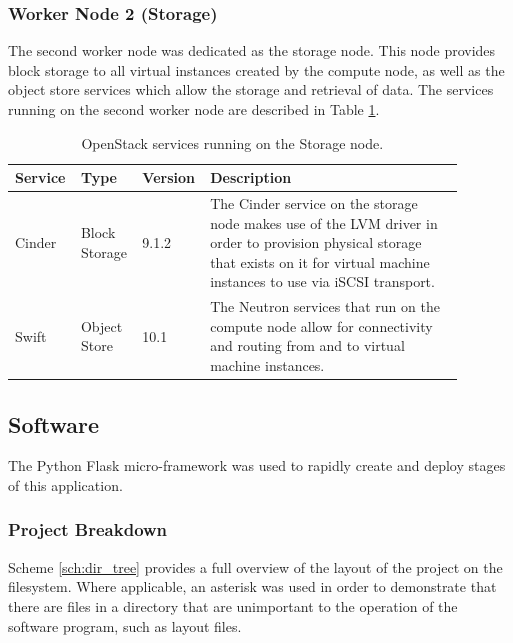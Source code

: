 \subsubsection{Worker Node 2 (Storage)}

The second worker node was dedicated as the storage node. This node provides block storage to all virtual instances created by the compute node, as well as the object store services which allow the storage and retrieval of data. The services running on the second worker node are described in Table \ref{tab:openstack_worker2_services}.

\begin{longtable}[c]{@{}p{0.12\linewidth}p{0.12\linewidth}p{0.1\linewidth}p{0.55\linewidth}@{}}
\caption[OpenStack Storage Node Service List]{OpenStack services running on the Storage node.}
\label{tab:openstack_worker2_services}\\
\toprule
Service & Type          & Version & Description                                                                                                                                                                                                              \\* \midrule
\endhead
%
Cinder  & Block Storage & 9.1.2   & The Cinder service on the storage node makes use of the LVM driver in order to provision physical storage that exists on it for virtual machine instances to use via iSCSI transport.               \\
Swift   & Object Store  & 10.1    & The Neutron services that run on the compute node allow for connectivity and routing from and to virtual machine instances. \\* \bottomrule
\end{longtable}

\subsection{Software}

The Python Flask micro-framework was used to rapidly create and deploy stages of this application.

\subsubsection{Project Breakdown}

Scheme \ref{sch:dir_tree} provides a full overview of the layout of the project on the filesystem. Where applicable, an asterisk was used in order to demonstrate that there are files in a directory that are unimportant to the operation of the software program, such as layout files.

